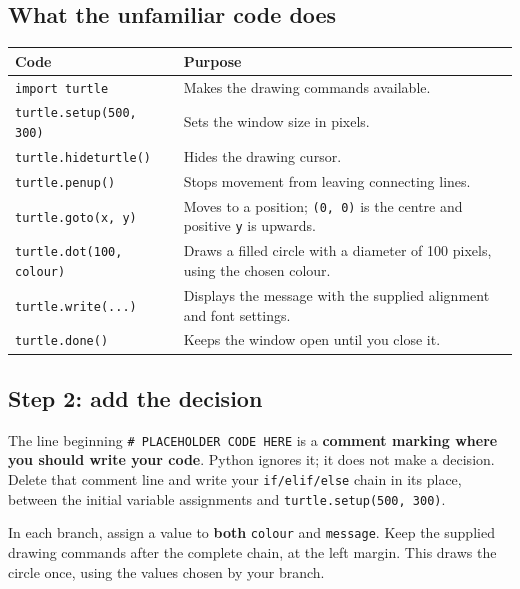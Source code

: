 \documentclass[12pt,a4paper]{article}
\begin{document}
\subsection*{What the unfamiliar code does}
\begingroup\small\renewcommand{\arraystretch}{1.3}\begin{longtable}{>{\raggedright\arraybackslash}p{}>{\raggedright\arraybackslash}p{}}
\toprule
\rowcolor{panel} Code & Purpose \\ \midrule\endhead
\texttt{import turtle} & Makes the drawing commands available. \\
\texttt{turtle.setup(500, 300)} & Sets the window size in pixels. \\
\texttt{turtle.hideturtle()} & Hides the drawing cursor. \\
\texttt{turtle.penup()} & Stops movement from leaving connecting lines. \\
\texttt{turtle.goto(x, y)} & Moves to a position; \texttt{(0, 0)} is the centre and positive \texttt{y} is upwards. \\
\texttt{turtle.dot(100, colour)} & Draws a filled circle with a diameter of 100 pixels, using the chosen colour. \\
\texttt{turtle.write(...)} & Displays the message with the supplied alignment and font settings. \\
\texttt{turtle.done()} & Keeps the window open until you close it. \\
\bottomrule\end{longtable}\endgroup
{}\subsection*{Step 2: add the decision}
The line beginning \texttt{\# PLACEHOLDER CODE HERE} is a \textbf{comment marking where you should write your code}. Python ignores it; it does not make a decision. Delete that comment line and write your \texttt{if/elif/else} chain in its place, between the initial variable assignments and \texttt{turtle.setup(500, 300)}.

In each branch, assign a value to \textbf{both} \texttt{colour} and \texttt{message}. Keep the supplied drawing commands after the complete chain, at the left margin. This draws the circle once, using the values chosen by your branch.
\end{document}
